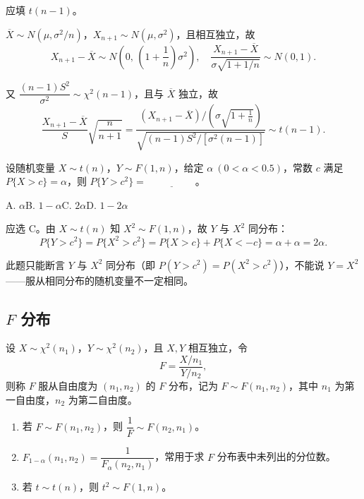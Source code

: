\documentclass[lang=cn,11pt]{elegantbook}
\begin{document}
\begin{solution}
应填 \(t(n-1)\)。

\(\overline{X} \sim N(\mu, \sigma^2/n)\)，\(X_{n+1} \sim N(\mu, \sigma^2)\)，且相互独立，故
\[
X_{n+1} - \overline{X} \sim N\!\left(0,\, \left(1+\frac{1}{n}\right)\sigma^2\right),\quad \frac{X_{n+1}-\overline{X}}{\sigma\sqrt{1+1/n}} \sim N(0,1).
\]

又 \(\dfrac{(n-1)S^2}{\sigma^2} \sim \chi^2(n-1)\)，且与 \(\overline{X}\) 独立，故
\[
\frac{X_{n+1}-\overline{X}}{S}\sqrt{\frac{n}{n+1}} = \frac{(X_{n+1}-\overline{X})\big/\!\left(\sigma\sqrt{1+\frac{1}{n}}\right)}{\sqrt{(n-1)S^2/[\sigma^2(n-1)]}} \sim t(n-1).
\]
\end{solution}

\begin{exercise}\label{exer:6-t-y-sq}
设随机变量 \(X \sim t(n)\)，\(Y \sim F(1,n)\)，给定 \(\alpha\ (0 < \alpha < 0.5)\)，常数 \(c\) 满足 \(P\{X > c\} = \alpha\)，则 \(P\{Y > c^2\} =\,\underline{\hspace{2cm}}\)。\par
A. \(\alpha\)\quad B. \(1-\alpha\)\quad C. \(2\alpha\)\quad D. \(1-2\alpha\)
\end{exercise}
\begin{solution}
应选 C。由 \(X \sim t(n)\) 知 \(X^2 \sim F(1,n)\)，故 \(Y\) 与 \(X^2\) 同分布：
\[
P\{Y > c^2\} = P\{X^2 > c^2\} = P\{X > c\} + P\{X < -c\} = \alpha + \alpha = 2\alpha.
\]
\begin{note}
此题只能断言 \(Y\) 与 \(X^2\) 同分布（即 \(P(Y>c^2)=P(X^2>c^2)\)），不能说 \(Y=X^2\)——服从相同分布的随机变量不一定相同。
\end{note}
\end{solution}

\subsection{\texorpdfstring{\(F\)}{F} 分布}

\begin{definition}[\texorpdfstring{\(F\)}{F} 分布] \label{def:f-dist}
设 \(X \sim \chi^2(n_1)\)，\(Y \sim \chi^2(n_2)\)，且 \(X, Y\) 相互独立，令
\[
F = \frac{X/n_1}{Y/n_2},
\]
则称 \(F\) 服从自由度为 \((n_1, n_2)\) 的 \(F\) 分布，记为 \(F \sim F(n_1, n_2)\)，其中 \(n_1\) 为第一自由度，\(n_2\) 为第二自由度。
\end{definition}

\begin{property}\label{prop:f-dist-property}
\begin{enumerate}
    \item 若 \(F \sim F(n_1, n_2)\)，则 \(\dfrac{1}{F} \sim F(n_2, n_1)\)。
    \item \(F_{1-\alpha}(n_1, n_2) = \dfrac{1}{F_\alpha(n_2, n_1)}\)，常用于求 \(F\) 分布表中未列出的分位数。
    \item 若 \(t \sim t(n)\)，则 \(t^2 \sim F(1, n)\)。
\end{enumerate}
\end{property}
\end{document}
